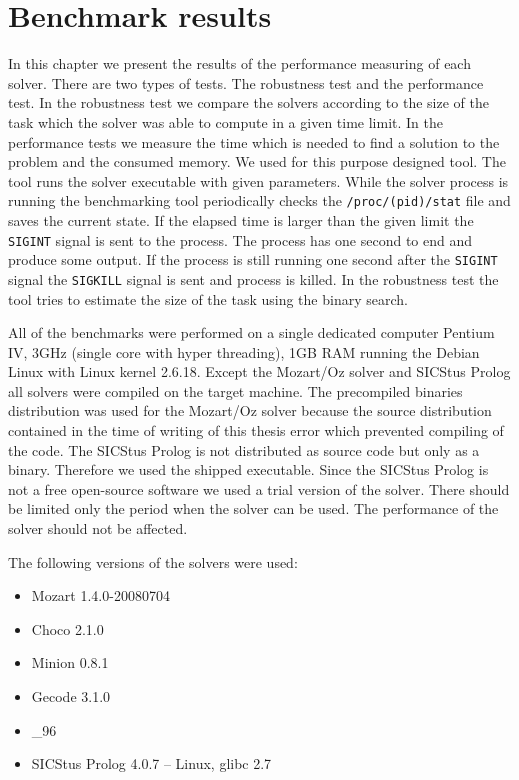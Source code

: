 \chapter{Benchmark results}
\label{results}

In this chapter we present the results of the performance measuring of each solver.
There are two types of tests. The robustness test and the performance test. In the robustness
test we compare the solvers according to the size of the task which the solver
was able to compute in a given time limit. In the performance tests we measure the time 
which is needed to find a solution to the problem and the consumed memory. We used 
for this purpose designed tool. The tool runs the solver executable with given parameters.
While the solver process is running the benchmarking tool periodically checks the \texttt{/proc/(pid)/stat} file
and saves the current state. If the elapsed time is larger than the given limit the 
\texttt{SIGINT} signal is sent to the process. The process has one second to end
and produce some output. If the process is still running one second after the 
\texttt{SIGINT} signal the \texttt{SIGKILL} signal is sent and process is killed. 
In the robustness test the tool tries to estimate the size of the task using the
binary search.

All of the benchmarks were performed on a single dedicated computer Pentium IV, 3GHz (single core 
with hyper threading),
1GB RAM running the Debian Linux with Linux kernel 2.6.18. Except the Mozart/Oz 
solver and SICStus Prolog all solvers were compiled on the target machine. The 
precompiled binaries distribution was used for the Mozart/Oz solver because the
source distribution contained in the time of writing of this thesis error which
prevented compiling of the code. The SICStus Prolog is not distributed as source 
code but only as a binary. Therefore we used the shipped executable. Since the 
SICStus Prolog is not a free open-source software we used a trial version of the solver.
There should be limited only the period when the solver can be used. The performance
of the solver should not be affected.

The following versions of the solvers were used:
\begin{itemize}
  \item Mozart 1.4.0-20080704
  \item Choco 2.1.0
  \item Minion 0.8.1
  \item Gecode 3.1.0
  \item {}\_96
  \item SICStus Prolog 4.0.7 -- Linux, glibc 2.7
\end{itemize}   

